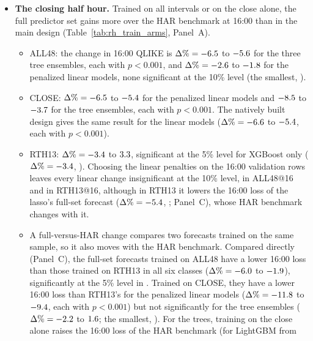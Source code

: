 \begin{itemize}
  rows are the forecasts of Table~\ref{tab:rh_oos}.
\item \textbf{The closing half hour.} Trained on all \rhtaNIntervals{} intervals or on the close alone, the full
  predictor set gains more over the HAR benchmark at 16:00 than in the main design
  (Table~\ref{tab:rh_train_arms}, Panel~A).
  \begin{itemize}
  \item ALL48: the change in 16:00 QLIKE is $\Delta\% = -6.5$ to $-5.6$ for the
    three tree ensembles, each with $p < 0.001$, and $\Delta\% = -2.6$ to $-1.8$
    for the penalized linear models, none significant at the 10\% level (the smallest, \rhtaLinAllClosePMin).
  \item CLOSE: $\Delta\% = -6.5$ to $-5.4$ for the penalized linear models and
    $-8.5$ to $-3.7$ for the tree ensembles, each with $p < 0.001$. The natively
    built design gives the same result for the linear models ($\Delta\% = -6.6$ to
    $-5.4$, each with $p < 0.001$).
  \item RTH13: $\Delta\% = -3.4$ to $3.3$, significant at the 5\% level for XGBoost
    only ($\Delta\% = -3.4$, \rhtaPXgbRthClose). Choosing the linear penalties on the 16:00 validation
    rows leaves every linear change insignificant at the 10\% level, in ALL48@16 and in RTH13@16, although in RTH13
    it lowers the 16:00 loss of the lasso's full-set forecast ($\Delta\% = -5.4$,
    \rhtaXPLassoRthCtVsRthClose; Panel~C), whose HAR benchmark changes with it.
  \item A full-versus-HAR change compares two forecasts trained on the same sample, so it also moves with the HAR
    benchmark. Compared directly (Panel~C), the full-set forecasts trained on ALL48 have a lower 16:00 loss than
    those trained on RTH13 in all six classes ($\Delta\% = -6.0$ to
    $-1.9$), significantly at the 5\% level in \rhtaNAllVsRthCloseSig. Trained on CLOSE, they
    have a lower 16:00 loss than RTH13's for the penalized linear models ($\Delta\% = -11.8$ to
    $-9.4$, each with $p < 0.001$) but not significantly for the tree ensembles
    ($\Delta\% = -2.2$ to $1.6$; the smallest, \rhtaTreeClVsRthClosePMin).
    For the trees, training on the close alone raises the 16:00 loss of the HAR benchmark (for LightGBM from

\end{itemize}
\end{itemize}
